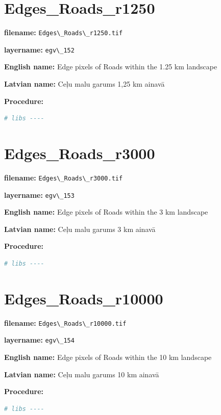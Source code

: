 \documentclass[
]{book}
\newcommand{\passthrough}[1]{#1}
\begin{document}
\section{Edges\_Roads\_r1250}\label{ch06.152}

\textbf{filename:} \passthrough{\lstinline!Edges\_Roads\_r1250.tif!}

\textbf{layername:} \passthrough{\lstinline!egv\_152!}

\textbf{English name:} Edge pixels of Roads within the 1.25 km landscape

\textbf{Latvian name:} Ceļu malu garums 1,25 km ainavā

\textbf{Procedure:}

\begin{lstlisting}[language=R]
# libs ----
\end{lstlisting}

\section{Edges\_Roads\_r3000}\label{ch06.153}

\textbf{filename:} \passthrough{\lstinline!Edges\_Roads\_r3000.tif!}

\textbf{layername:} \passthrough{\lstinline!egv\_153!}

\textbf{English name:} Edge pixels of Roads within the 3 km landscape

\textbf{Latvian name:} Ceļu malu garums 3 km ainavā

\textbf{Procedure:}

\begin{lstlisting}[language=R]
# libs ----
\end{lstlisting}

\section{Edges\_Roads\_r10000}\label{ch06.154}

\textbf{filename:} \passthrough{\lstinline!Edges\_Roads\_r10000.tif!}

\textbf{layername:} \passthrough{\lstinline!egv\_154!}

\textbf{English name:} Edge pixels of Roads within the 10 km landscape

\textbf{Latvian name:} Ceļu malu garums 10 km ainavā

\textbf{Procedure:}

\begin{lstlisting}[language=R]
# libs ----
\end{lstlisting}
\end{document}
